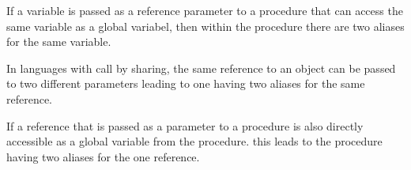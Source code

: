 If a variable is passed as a reference parameter to a procedure that can access the same variable
as a global variabel, then within the procedure there are two aliases for the same variable.

In languages with call by sharing, the same reference to an object can be passed to two different 
parameters leading to one having two aliases for the same reference.

If a reference that is passed as a parameter to a procedure is also directly accessible as a 
global variable from the procedure. this leads to the procedure having two aliases for the one 
reference.